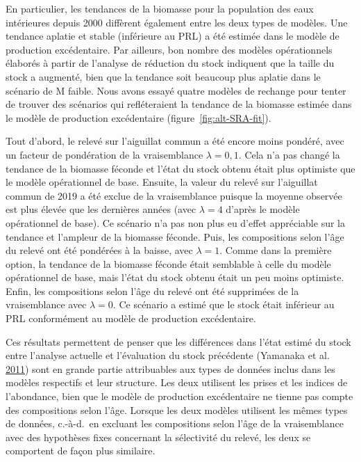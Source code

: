 \documentclass[11pt]{book}
\begin{document}
En particulier, les tendances de la biomasse pour la population des eaux intérieures depuis 2000 diffèrent également entre les deux types de modèles. Une tendance aplatie et stable (inférieure au PRL) a été estimée dans le modèle de production excédentaire. Par ailleurs, bon nombre des modèles opérationnels élaborés à partir de l'analyse de réduction du stock indiquent que la taille du stock a augmenté, bien que la tendance soit beaucoup plus aplatie dans le scénario de M faible. Nous avons essayé quatre modèles de rechange pour tenter de trouver des scénarios qui refléteraient la tendance de la biomasse estimée dans le modèle de production excédentaire (figure~\ref{fig:alt-SRA-fit}).

Tout d'abord, le relevé sur l'aiguillat commun a été encore moins pondéré, avec un facteur de pondération de la vraisemblance \(\lambda = 0,1\). Cela n'a pas changé la tendance de la biomasse féconde et l'état du stock obtenu était plus optimiste que le modèle opérationnel de base. Ensuite, la valeur du relevé sur l'aiguillat commun de 2019 a été exclue de la vraisemblance puisque la moyenne observée est plus élevée que les dernières années (avec \(\lambda = 4\) d'après le modèle opérationnel de base). Ce scénario n'a pas non plus eu d'effet appréciable sur la tendance et l'ampleur de la biomasse féconde. Puis, les compositions selon l'âge du relevé ont été pondérées à la baisse, avec \(\lambda = 1\). Comme dans la première option, la tendance de la biomasse féconde était semblable à celle du modèle opérationnel de base, mais l'état du stock obtenu était un peu moins optimiste. Enfin, les compositions selon l'âge du relevé ont été supprimées de la vraisemblance avec \(\lambda = 0\). Ce scénario a estimé que le stock était inférieur au PRL conformément au modèle de production excédentaire.

Ces résultats permettent de penser que les différences dans l'état estimé du stock entre l'analyse actuelle et l'évaluation du stock précédente (Yamanaka et al. \protect\hyperlink{ref-yamanaka2011}{2011}) sont en grande partie attribuables aux types de données inclus dans les modèles respectifs et leur structure. Les deux utilisent les prises et les indices de l'abondance, bien que le modèle de production excédentaire ne tienne pas compte des compositions selon l'âge. Lorsque les deux modèles utilisent les mêmes types de données, c.-à-d.~en excluant les compositions selon l'âge de la vraisemblance avec des hypothèses fixes concernant la sélectivité du relevé, les deux se comportent de façon plus similaire.
\end{document}
